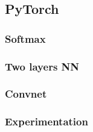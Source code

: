 \documentclass[11pt,english]{article}
\begin{document}
    

    

    \subsection{PyTorch}
    \subsubsection{Softmax}
    

\pagebreak

    \subsubsection{Two layers NN}
    

\pagebreak

    \subsubsection{Convnet}
    

\pagebreak

    \subsubsection{Experimentation}
    
\end{document}

